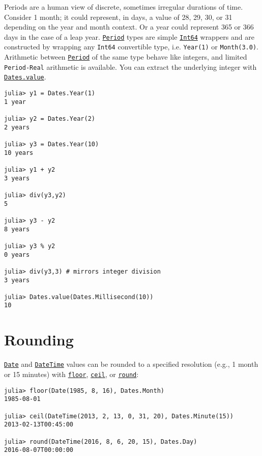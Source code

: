 Periods are a human view of discrete, sometimes irregular durations of time. Consider 1 month; it could represent, in days, a value of 28, 29, 30, or 31 depending on the year and month context. Or a year could represent 365 or 366 days in the case of a leap year. \hyperlink{17624028548543163266}{\texttt{Period}} types are simple \hyperlink{7720564657383125058}{\texttt{Int64}} wrappers and are constructed by wrapping any \texttt{Int64} convertible type, i.e. \texttt{Year(1)} or \texttt{Month(3.0)}. Arithmetic between \hyperlink{17624028548543163266}{\texttt{Period}} of the same type behave like integers, and limited \texttt{Period-Real} arithmetic is available.  You can extract the underlying integer with \hyperlink{6471383377711200525}{\texttt{Dates.value}}.




\begin{verbatim}
julia> y1 = Dates.Year(1)
1 year

julia> y2 = Dates.Year(2)
2 years

julia> y3 = Dates.Year(10)
10 years

julia> y1 + y2
3 years

julia> div(y3,y2)
5

julia> y3 - y2
8 years

julia> y3 % y2
0 years

julia> div(y3,3) # mirrors integer division
3 years

julia> Dates.value(Dates.Millisecond(10))
10
\end{verbatim}



\hypertarget{12464510960418657842}{}


\section{Rounding}



\hyperlink{4488183467971164548}{\texttt{Date}} and \hyperlink{17572689933274889838}{\texttt{DateTime}} values can be rounded to a specified resolution (e.g., 1 month or 15 minutes) with \hyperlink{11115257331910840693}{\texttt{floor}}, \hyperlink{10519509038312853061}{\texttt{ceil}}, or \hyperlink{2394121098218027856}{\texttt{round}}:




\begin{verbatim}
julia> floor(Date(1985, 8, 16), Dates.Month)
1985-08-01

julia> ceil(DateTime(2013, 2, 13, 0, 31, 20), Dates.Minute(15))
2013-02-13T00:45:00

julia> round(DateTime(2016, 8, 6, 20, 15), Dates.Day)
2016-08-07T00:00:00
\end{verbatim}



